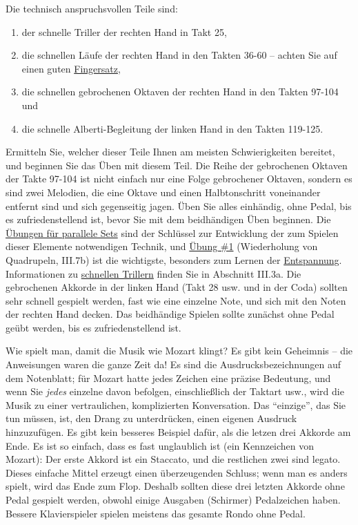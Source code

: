 Die technisch anspruchsvollen Teile sind:

\begin{enumerate}[label={\arabic*.}] 
 \item der schnelle Triller der rechten Hand in Takt 25,
 \item die schnellen Läufe der rechten Hand in den Takten 36-60 -- achten Sie auf einen guten \hyperref[c1ii18]{Fingersatz},
 \item die schnellen gebrochenen Oktaven der rechten Hand in den Takten 97-104 und 
 \item die schnelle Alberti-Begleitung der linken Hand in den Takten 119-125.
\end{enumerate}

Ermitteln Sie, welcher dieser Teile Ihnen am meisten Schwierigkeiten bereitet, und beginnen Sie das Üben mit diesem Teil.
Die Reihe der gebrochenen Oktaven der Takte 97-104 ist nicht einfach nur eine Folge gebrochener Oktaven, sondern es sind zwei Melodien, die eine Oktave und einen Halbtonschritt voneinander entfernt sind und sich gegenseitig jagen.
Üben Sie alles einhändig, ohne Pedal, bis es zufriedenstellend ist, bevor Sie mit dem beidhändigen Üben beginnen.
Die \hyperref[c1iii7b]{Übungen für parallele Sets} sind der Schlüssel zur Entwicklung der zum Spielen dieser Elemente notwendigen Technik, und \hyperref[c1iii7b1]{Übung \#1} (Wiederholung von Quadrupeln, III.7b) ist die wichtigste, besonders zum Lernen der \hyperref[c1ii14]{Entspannung}.
Informationen zu \hyperref[c1iii3]{schnellen Trillern} finden Sie in Abschnitt III.3a.
Die gebrochenen Akkorde in der linken Hand (Takt 28 usw. und in der Coda) sollten sehr schnell gespielt werden, fast wie eine einzelne Note, und sich mit den Noten der rechten Hand decken.
Das beidhändige Spielen sollte zunächst ohne Pedal geübt werden, bis es zufriedenstellend ist.

Wie spielt man, damit die Musik wie Mozart klingt?
Es gibt kein Geheimnis -- die Anweisungen waren die ganze Zeit da!
Es sind die Ausdrucksbezeichnungen auf dem Notenblatt; für Mozart hatte jedes Zeichen eine präzise Bedeutung, und wenn Sie \textit{jedes} einzelne davon befolgen, einschließlich der Taktart usw., wird die Musik zu einer vertraulichen, komplizierten Konversation.
Das \enquote{einzige}, das Sie tun müssen, ist, den Drang zu unterdrücken, einen eigenen Ausdruck hinzuzufügen.
Es gibt kein besseres Beispiel dafür, als die letzen drei Akkorde am Ende.
Es ist so einfach, dass es fast unglaublich ist (ein Kennzeichen von Mozart): Der erste Akkord ist ein Staccato, und die restlichen zwei sind legato.
Dieses einfache Mittel erzeugt einen überzeugenden Schluss; wenn man es anders spielt, wird das Ende zum Flop.
Deshalb sollten diese drei letzten Akkorde ohne Pedal gespielt werden, obwohl einige Ausgaben (Schirmer) Pedalzeichen haben.
Bessere Klavierspieler spielen meistens das gesamte Rondo ohne Pedal.


